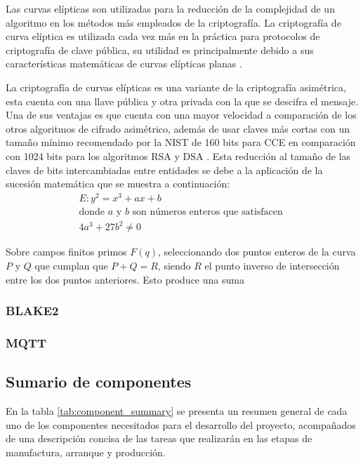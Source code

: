 \documentclass{article}
\begin{document}
                Las curvas elípticas son utilizadas para la reducción de la complejidad de un algoritmo en los métodos más empleados de la criptografía. La criptografía de curva elíptica es utilizada cada vez más en la práctica para protocolos de criptografía de clave pública, su utilidad es principalmente debido a sus características matemáticas de curvas elípticas planas \cite{sanchez2021solucion}.

                La criptografía de curvas elípticas es una variante de la criptografía asimétrica, esta cuenta con una llave pública y otra privada con la que se descifra el mensaje. Una de sus ventajas es que cuenta con una mayor velocidad a comparación de los otros algoritmos de cifrado asimétrico, además de usar claves más cortas con un tamaño mínimo recomendado por la NIST de 160 bits para CCE en comparación con 1024 bits para los algoritmos RSA y DSA \cite{ramirez2018sistemas}. Esta reducción al tamaño de las claves de bits intercambiadas entre entidades se debe a la aplicación de la sucesión matemática que se muestra a continuación:
                \begin{gather*}
                    E:y^2=x^3 + ax + b \\
                    \text{donde $a$ y $b$ son números enteros que satisfacen }\\
                    4a^3 + 27b^2 \neq 0
                \end{gather*}

                Sobre campos finitos primos $F(q)$, seleccionando dos puntos enteros de la curva $P$ y $Q$ que cumplan que $P+Q=R$, siendo $R$ el punto inverso de intersección entre los dos puntos anteriores. Esto produce una suma

            \subsubsection{BLAKE2}

            \subsubsection{MQTT}

        \subsection{Sumario de componentes}

            En la tabla \ref{tab:component_summary} se presenta un resumen general de cada uno de los componentes necesitados para el desarrollo del proyecto, acompañados de una descripción concisa de las tareas que realizarán en las etapas de manufactura, arranque y producción.
\end{document}
